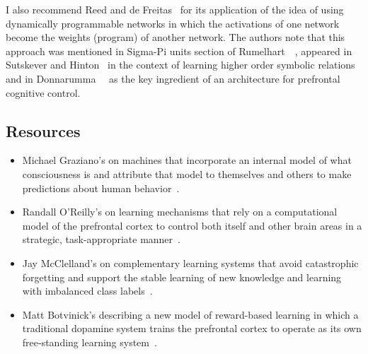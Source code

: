 I also recommend Reed and de Freitas~\cite{ReedandDeFreitasCoRR-15} for its application of the idea of using dynamically programmable networks in which the activations of one network become the weights (program) of another network.  The authors note that this approach was mentioned in Sigma-Pi units section of Rumelhart~\etal{}~\cite{RumelhartetalPDP-86b}, appeared in Sutskever and Hinton~\cite{SutskeverandHintonNIPS-09} in the context of learning higher order symbolic relations and in Donnarumma~\etal{}~\cite{DonnarummaetalIJNS-15} as the key ingredient of an architecture for prefrontal cognitive control.


\subsection{Resources}



\begin{itemize}
%
\item Michael Graziano's {} on machines that incorporate an internal model of what consciousness is and attribute that model to themselves and others to make predictions about human behavior~\cite{GrazianoFiRAI-17}.
%
\item Randall O'Reilly's {} on learning mechanisms that rely on a computational model of the prefrontal cortex to control both itself and other brain areas in a strategic, task-appropriate manner~\cite{OReillyandFrankNC-06}.
%
\item Jay McClelland's {} on complementary learning systems that avoid catastrophic forgetting and support the stable learning of new knowledge and learning with imbalanced class labels~\cite{SprechmannetalICLR-18}.
%
\item Matt Botvinick's {} describing a new model of reward-based learning in which a traditional dopamine system trains the prefrontal cortex to operate as its own free-standing learning system~\cite{WangetalNATURE-NEUROSCIENCE-18}.
%
\end{itemize}

